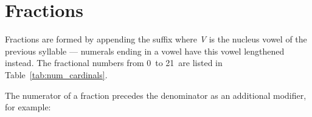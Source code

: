 \documentclass[grammar]{subfiles}
\begin{document}
  \section{Fractions}
  \label{sec:num_fractions}

  Fractions are formed by appending the suffix  where \textit{V} is the nucleus vowel of the previous syllable — numerals ending in a vowel have this vowel lengthened instead. The fractional numbers from 0\dec\ to 21\dec\ are listed in Table~\ref{tab:num_cardinals}.

  \begin{table}[htpb]\small\capstart
      \qquad
      \caption{Fractional numerals from 0\dec\ to 21\dec\label{tab:num_fractional}}
  \end{table}

  \newpage
  The numerator of a fraction precedes the denominator as an additional modifier, for example:
\end{document}
